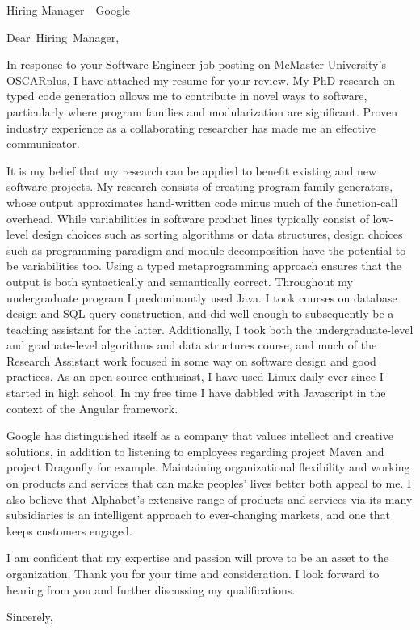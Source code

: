 \documentclass[
fontsize=12pt,
paper=letter,
parskip=half,
enlargefirstpage=on,    %
fromalign=right,        %
fromphone=on,           %
fromemail=on,
fromrule=aftername,     %
addrfield=off,           %
backaddress=off,         %
subject=beforeopening,  %
locfield=narrow,        %
foldmarks=off,           %
]{scrlttr2}
\renewcommand{\\}{\ {\large\textperiodcentered}\ }
\begin{document}

\begin{letter}{Hiring Manager\\Google}


\opening{Dear~Hiring~Manager,}

In response to your Software Engineer job posting on McMaster University's OSCARplus, I have attached my resume for your review.
My PhD research on typed code generation allows me to contribute in novel ways to software, particularly where program families and modularization are significant.
Proven industry experience as a collaborating researcher has made me an effective communicator.

It is my belief that my research can be applied to benefit existing and new software projects.
My research consists of creating program family generators, whose output approximates hand-written code minus much of the function-call overhead.
While variabilities in software product lines typically consist of low-level design choices such as sorting algorithms or data structures, design choices such as programming paradigm and module decomposition have the potential to be variabilities too.
Using a typed metaprogramming approach ensures that the output is both syntactically and semantically correct.
Throughout my undergraduate program I predominantly used Java.
I took courses on database design and SQL query construction, and did well enough to subsequently be a teaching assistant for the latter.
Additionally, I took both the undergraduate-level and graduate-level algorithms and data structures course, and much of the Research Assistant work focused in some way on software design and good practices.
As an open source enthusiast, I have used Linux daily ever since I started in high school.
In my free time I have dabbled with Javascript in the context of the Angular framework.

Google has distinguished itself as a company that values intellect and creative solutions, in addition to listening to employees regarding project Maven and project Dragonfly for example.
Maintaining organizational flexibility and working on products and services that can make peoples' lives better both appeal to me.
I also believe that Alphabet's extensive range of products and services via its many subsidiaries is an intelligent approach to ever-changing markets, and one that keeps customers engaged.

I am confident that my expertise and passion will prove to be an asset to the organization.
Thank you for your time and consideration.
I look forward to hearing from you and further discussing my qualifications.
\closing{Sincerely,}


\end{letter}
\end{document}
